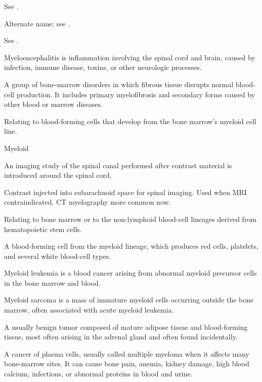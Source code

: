  See .

 Alternate name; see .

 See .

 Myeloencephalitis is inflammation involving the spinal cord and brain, caused by infection, immune disease, toxins, or other neurologic processes.

 A group of bone-marrow disorders in which fibrous tissue disrupts normal blood-cell production. It includes primary myelofibrosis and secondary forms caused by other blood or marrow diseases.

 Relating to blood-forming cells that develop from the bone marrow's myeloid cell line.

\synonyms
Myeloid

 An imaging study of the spinal canal performed after contrast material is introduced around the spinal cord.

 Contrast injected into subarachnoid space for spinal imaging. Used when MRI
contraindicated. CT myelography more common now.

 Relating to bone marrow or to the non-lymphoid blood-cell lineages derived from hematopoietic stem cells.

 A blood-forming cell from the myeloid lineage, which produces red cells, platelets, and several white blood-cell types.

 Myeloid leukemia is a blood cancer arising from abnormal myeloid precursor cells in the bone marrow and blood.

 Myeloid sarcoma is a mass of immature myeloid cells occurring outside the bone marrow, often associated with acute myeloid leukemia.

 A usually benign tumor composed of mature adipose tissue and blood-forming tissue, most often arising in the adrenal gland and often found incidentally.

 A cancer of plasma cells, usually called multiple myeloma when it affects many bone-marrow sites. It can cause bone pain, anemia, kidney damage, high blood calcium, infections, or abnormal proteins in blood and urine.

